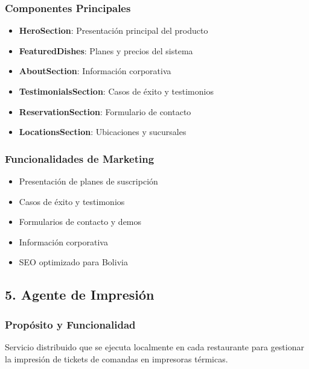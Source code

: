 \documentclass[12pt,a4paper]{article}
\begin{document}
\subsubsection{Componentes Principales}
\begin{itemize}
    \item \textbf{HeroSection}: Presentación principal del producto
    \item \textbf{FeaturedDishes}: Planes y precios del sistema
    \item \textbf{AboutSection}: Información corporativa
    \item \textbf{TestimonialsSection}: Casos de éxito y testimonios
    \item \textbf{ReservationSection}: Formulario de contacto
    \item \textbf{LocationsSection}: Ubicaciones y sucursales
\end{itemize}

\subsubsection{Funcionalidades de Marketing}
\begin{itemize}
    \item Presentación de planes de suscripción
    \item Casos de éxito y testimonios
    \item Formularios de contacto y demos
    \item Información corporativa
    \item SEO optimizado para Bolivia
\end{itemize}

\subsection{5. Agente de Impresión}

\subsubsection{Propósito y Funcionalidad}
Servicio distribuido que se ejecuta localmente en cada restaurante para gestionar la impresión de tickets de comandas en impresoras térmicas.
\end{document}
